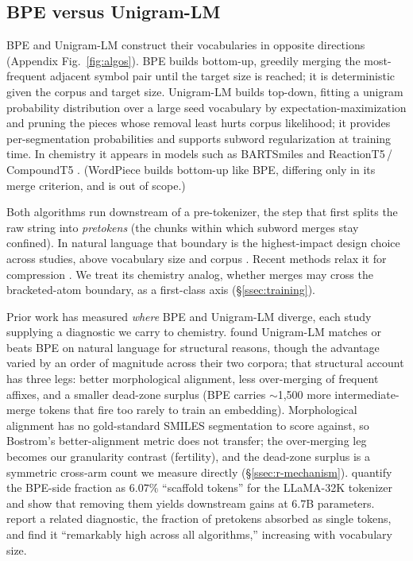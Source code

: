\documentclass{article}
\begin{document}
\subsection{BPE versus Unigram-LM}\label{ssec:algo}

BPE and Unigram-LM construct their vocabularies in opposite directions
(Appendix Fig.~\ref{fig:algos}). BPE
\citep{sennrich2016bpe-nmt} builds bottom-up, greedily merging the
most-frequent adjacent symbol pair until the target size is reached; it
is deterministic given the corpus and target size. Unigram-LM
\citep{kudo2018subword-reg} builds top-down, fitting a unigram
probability distribution over a large seed vocabulary by
expectation-maximization and pruning the pieces whose removal least hurts
corpus likelihood; it provides per-segmentation probabilities and
supports subword regularization at training time. In chemistry it appears in
models such as BARTSmiles \citep{chilingaryan2024bartsmiles} and
ReactionT5\,/\,CompoundT5 \citep{sagawa2023reactiont5}. (WordPiece
\citep{schuster2012jp-kr-voice-search} builds bottom-up like BPE, differing
only in its merge criterion, and is out of scope.)

Both algorithms run downstream of a pre-tokenizer, the step that first splits the
raw string into \emph{pretokens} (the chunks within which subword merges stay
confined). In natural language that boundary is the highest-impact design
choice across studies, above vocabulary
size and corpus \citep{wegmann2025tokenization, reddy2025diminishing-tokenization}.
Recent methods relax it for compression \citep{liu2025superbpe,
schmidt2025boundless-bpe}. We treat its chemistry analog, whether merges may
cross the bracketed-atom boundary, as a first-class axis (\S\ref{ssec:training}).

Prior work has measured \emph{where} BPE and Unigram-LM diverge, each study
supplying a diagnostic we carry to chemistry. \citet{bostrom2020bpe-suboptimal}
found Unigram-LM matches or beats BPE on natural language for structural reasons,
though the advantage varied by an order of magnitude across their two corpora;
that structural account has three
legs: better morphological alignment, less over-merging of frequent affixes,
and a smaller dead-zone surplus (BPE carries $\sim$1{,}500 more
intermediate-merge tokens that fire too rarely to train an embedding).
Morphological alignment has no gold-standard SMILES segmentation to score
against, so Bostrom's better-alignment metric does not transfer; the
over-merging leg becomes our granularity contrast (fertility), and the dead-zone
surplus is a symmetric cross-arm count we measure directly
(\S\ref{ssec:r-mechanism}).
\citet{lian2024scaffold-bpe} quantify the BPE-side fraction as
$6.07\%$ ``scaffold tokens'' for the LLaMA-32K tokenizer \citep{touvron2023llama} and show
that removing them yields downstream gains at 6.7B parameters.
\citet{reddy2025diminishing-tokenization} report a related diagnostic, the
fraction of pretokens absorbed as single tokens, and find it ``remarkably
high across all algorithms,'' increasing with vocabulary size.
\end{document}
